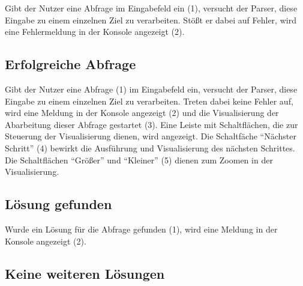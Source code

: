 \documentclass[parskip=full,11pt,twoside]{scrartcl}
\begin{document}
\begin{minipage}{\linewidth}
\end{minipage}

Gibt der Nutzer eine Abfrage im Eingabefeld ein (1), versucht der Parser, diese Eingabe zu einem einzelnen Ziel zu verarbeiten.
Stößt er dabei auf Fehler, wird eine Fehlermeldung in der Konsole angezeigt (2).

\subsection{Erfolgreiche Abfrage}

\begin{minipage}{\linewidth}
\end{minipage}

Gibt der Nutzer eine Abfrage (1) im Eingabefeld ein, versucht der Parser, diese Eingabe zu einem einzelnen Ziel zu verarbeiten.
Treten dabei keine Fehler auf, wird eine Meldung in der Konsole angezeigt (2) und die Visualisierung der Abarbeitung dieser Abfrage gestartet (3).
Eine Leiste mit Schaltflächen, die zur Steuerung der Visualisierung dienen, wird angezeigt.
Die Schaltfäche \enquote{Nächster Schritt} (4) bewirkt die Ausführung und Visualisierung des nächsten Schrittes.
Die Schaltflächen \enquote{Größer} und \enquote{Kleiner} (5) dienen zum Zoomen in der Visualisierung.

\subsection{Lösung gefunden}

\begin{minipage}{\linewidth}
\end{minipage}

Wurde ein Lösung für die Abfrage gefunden (1), wird eine Meldung in der Konsole angezeigt (2).

\subsection{Keine weiteren Lösungen}
\end{document}
